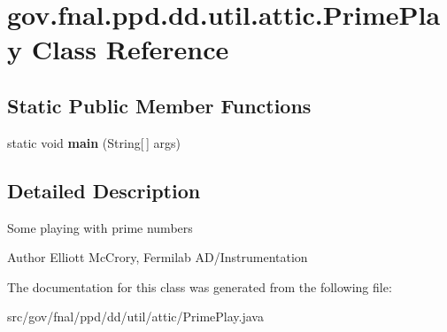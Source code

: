 \hypertarget{classgov_1_1fnal_1_1ppd_1_1dd_1_1util_1_1attic_1_1PrimePlay}{\section{gov.\-fnal.\-ppd.\-dd.\-util.\-attic.\-Prime\-Play Class Reference}
\label{classgov_1_1fnal_1_1ppd_1_1dd_1_1util_1_1attic_1_1PrimePlay}
}
\subsection*{Static Public Member Functions}
\begin{DoxyCompactItemize}
\item 
\hypertarget{classgov_1_1fnal_1_1ppd_1_1dd_1_1util_1_1attic_1_1PrimePlay_a961aee05d9aef23afcc6b41919c87574}{static void {\bfseries main} (String\mbox{[}$\,$\mbox{]} args)}\label{classgov_1_1fnal_1_1ppd_1_1dd_1_1util_1_1attic_1_1PrimePlay_a961aee05d9aef23afcc6b41919c87574}

\end{DoxyCompactItemize}


\subsection{Detailed Description}
Some playing with prime numbers

\begin{DoxyAuthor}{Author}
Elliott Mc\-Crory, Fermilab A\-D/\-Instrumentation 
\end{DoxyAuthor}


The documentation for this class was generated from the following file\-:\begin{DoxyCompactItemize}
\item 
src/gov/fnal/ppd/dd/util/attic/Prime\-Play.\-java\end{DoxyCompactItemize}
